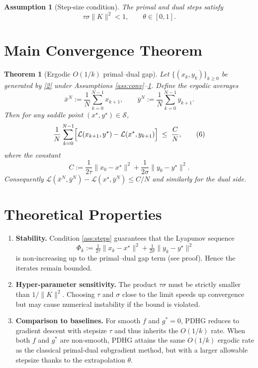 \documentclass{article}
\newtheorem{theorem}{Theorem}
\newtheorem{assumption}{Assumption}
\newcommand{\norm}[1]{\|#1\|}
\begin{document}
\begin{assumption}[Step‑size condition]\label{ass:steps}
The primal and dual steps satisfy
\[
\tau\sigma\|K\|^{2}<1,\qquad \theta\in[0,1].
\tag{5}
\]
\end{assumption}

\section*{Main Convergence Theorem}
\begin{theorem}[Ergodic $O(1/k)$ primal–dual gap]\label{thm:ergodic}
Let $\{(x_{k},y_{k})\}_{k\ge0}$ be generated by \eqref{2} under Assumptions \ref{ass:conv}–\ref{ass:steps}.
Define the ergodic averages
\[
\bar x^{N}:=\frac{1}{N}\sum_{k=0}^{N-1} x_{k+1},
\qquad 
\bar y^{N}:=\frac{1}{N}\sum_{k=0}^{N-1} y_{k+1}.
\]
Then for any saddle point $(x^{\star},y^{\star})\in\mathcal S$,
\[
\frac{1}{N}\sum_{k=0}^{N-1}
\Bigl[\mathcal L(x_{k+1},y^{\star})-\mathcal L(x^{\star},y_{k+1})\Bigr]
\;\le\;
\frac{C}{N},
\tag{6}
\]
where the constant
\[
C:=\frac{1}{2\tau}\norm{x_{0}-x^{\star}}^{2}
     +\frac{1}{2\sigma}\norm{y_{0}-y^{\star}}^{2}.
\tag{7}
\]
Consequently $\mathcal L(\bar x^{N},\bar y^{N})- \mathcal L(x^{\star},\bar y^{N})
\le C/N$ and similarly for the dual side.
\end{theorem}

\section*{Theoretical Properties}
\begin{enumerate}[label=(\alph*)]
\item \textbf{Stability.} Condition \eqref{ass:steps} guarantees that the Lyapunov sequence
\[
\Phi_{k}:=\tfrac{1}{2\tau}\norm{x_{k}-x^{\star}}^{2}
          +\tfrac{1}{2\sigma}\norm{y_{k}-y^{\star}}^{2}
\]
is non‑increasing up to the primal–dual gap term (see proof). Hence the iterates remain bounded.
\item \textbf{Hyper‑parameter sensitivity.} The product $\tau\sigma$ must be strictly smaller than $1/\|K\|^{2}$.
Choosing $\tau$ and $\sigma$ close to the limit speeds up convergence but may cause numerical instability if the bound is violated.
\item \textbf{Comparison to baselines.} For smooth $f$ and $g^{*}=0$, PDHG reduces to gradient descent with stepsize $\tau$ and thus inherits the $O(1/k)$ rate.
When both $f$ and $g^{*}$ are non‑smooth, PDHG attains the same $O(1/k)$ ergodic rate as the classical primal‑dual subgradient method, but with a larger allowable stepsize thanks to the extrapolation $\theta$.
\end{enumerate}
\end{document}
